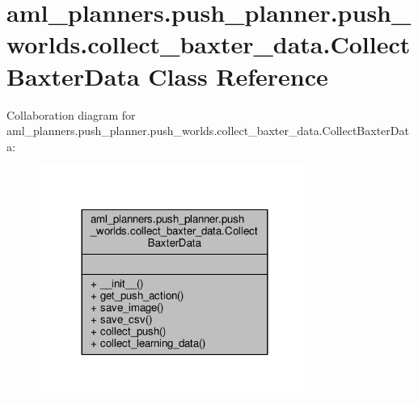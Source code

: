 \hypertarget{classaml__planners_1_1push__planner_1_1push__worlds_1_1collect__baxter__data_1_1_collect_baxter_data}{\section{aml\-\_\-planners.\-push\-\_\-planner.\-push\-\_\-worlds.\-collect\-\_\-baxter\-\_\-data.\-Collect\-Baxter\-Data Class Reference}
\label{classaml__planners_1_1push__planner_1_1push__worlds_1_1collect__baxter__data_1_1_collect_baxter_data}
}


Collaboration diagram for aml\-\_\-planners.\-push\-\_\-planner.\-push\-\_\-worlds.\-collect\-\_\-baxter\-\_\-data.\-Collect\-Baxter\-Data\-:\nopagebreak
\begin{figure}[H]
\begin{center}
\leavevmode
\includegraphics[width=252pt]{classaml__planners_1_1push__planner_1_1push__worlds_1_1collect__baxter__data_1_1_collect_baxter_data__coll__graph}
\end{center}
\end{figure}
